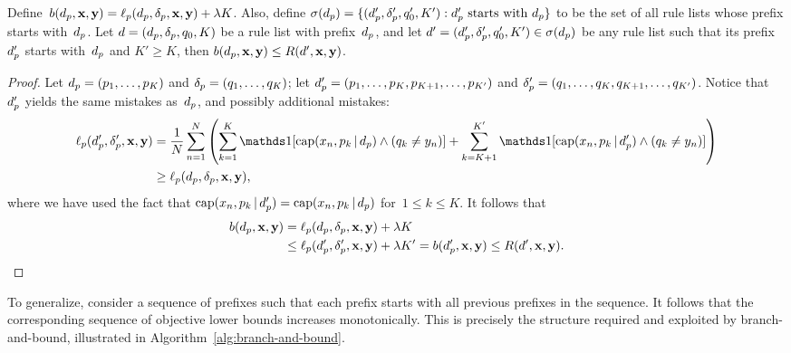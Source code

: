 \begin{theorem}
Define~${b(d_p, \mathbf{x}, \mathbf{y}) = \ell_p(d_p, \delta_p, \mathbf{x}, \mathbf{y}) + {\lambda} K}$.
%
Also, define
${\sigma(d_p) = \{(d_p', \delta_p', q_0', K') : d_p' \textnormal{ starts with } d_p \}}$
to be the set of all rule lists whose prefix starts with~$d_p$.
%
Let ${{d} = (d_p, \delta_p, q_0, K)}$ be a rule list
with prefix~$d_p$, and let
${{d}' = (d_p', \delta_p', q_0', K') \in \sigma(d_p)}$
be any rule list such that its prefix~$d_p'$ starts with~$d_p$
and ${K' \ge K}$, then ${b(d_p, \mathbf{x}, \mathbf{y}) \le R({d}', \mathbf{x}, \mathbf{y})}$.
\label{thm:bound}
\end{theorem}

\begin{proof}
Let ${d_p = (p_1, \dots, p_K)}$ and ${\delta_p = (q_1, \dots, q_K)}$;
let ${d_p' = (p_1, \dots, p_K, p_{K+1}, \dots, p_{K'})}$
and ${\delta_p' = (q_1, \dots, q_K, q_{K+1}, \dots, q_{K'})}$.
%
Notice that~$d_p'$ yields the same mistakes as~$d_p$,
and possibly additional mistakes:
\begin{align}
\Loss_p(\Prefix', \Labels', \x, \y)
&= \frac{1}{N} \sum_{n=1}^N \left( \sum_{k=1}^K \one [ \Cap(x_n, p_k \given \Prefix) \wedge (q_k \neq y_n) ]
+ \sum_{k=K+1}^{K'} \one [ \Cap(x_n, p_k \given \Prefix') \wedge (q_k \neq y_n) ] \right) \nn \\
&\ge \Loss_p(\Prefix, \Labels, \x, \y),
\label{eq:prefix-loss}
\end{align}
where we have used the fact that
${\textnormal{cap}(x_n, p_k \,|\, d_p') = \textnormal{cap}(x_n, p_k \,|\, d_p)}$
for~${1 \le k \le K}$.
%
It follows that
\begin{align}
b(\Prefix, \x, \y) &= \Loss_p(\Prefix, \Labels, \x, \y) + \Reg K \nn \\
&\le  \Loss_p(\Prefix', \Labels', \x, \y) + \Reg K' = b(\Prefix', \x, \y)
\le \Obj(\RL', \x, \y).
\label{eq:prefix-lb}
\end{align}
\end{proof}

To generalize, consider a sequence of prefixes such that each prefix
starts with all previous prefixes in the sequence.
%
It follows that the corresponding sequence of objective lower bounds
increases monotonically.
%
This is precisely the structure required and exploited by branch-and-bound,
illustrated in Algorithm~\ref{alg:branch-and-bound}.


